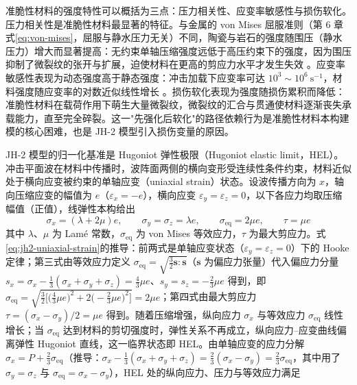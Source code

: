 准脆性材料的强度特性可以概括为三点：压力相关性、应变率敏感性与损伤软化。压力相关性是准脆性材料最显著的特征。与金属的 von Mises 屈服准则（第 6 章式\eqref{eq:von-mises}，屈服与静水压力无关）不同，陶瓷与岩石的强度随围压（静水压力）增大而显著提高：无约束单轴压缩强度远低于高压约束下的强度，因为围压抑制了微裂纹的张开与扩展，迫使材料在更高的剪应力水平才发生失效 \cite{JohnsonHolmquist1994,JohnsonHolmquist1999}。应变率敏感性表现为动态强度高于静态强度：冲击加载下应变率可达 $10^{3}\sim10^{6}~\mathrm{s}^{-1}$，材料强度随应变率的对数近似线性增长 \cite{HolmquistTempletonBishnoi2001}。损伤软化表现为强度随损伤累积而降低：准脆性材料在载荷作用下萌生大量微裂纹，微裂纹的汇合与贯通使材料逐渐丧失承载能力，直至完全碎裂。这一"先强化后软化"的路径依赖行为是准脆性材料本构建模的核心困难，也是 JH-2 模型引入损伤变量的原因。

JH-2 模型的归一化基准是 Hugoniot 弹性极限（Hugoniot elastic limit，HEL）。冲击平面波在材料中传播时，波阵面两侧的横向变形受连续性条件约束，材料近似处于横向应变被约束的单轴应变（uniaxial strain）状态。设波传播方向为 $x$，轴向压缩应变的幅值为 $e$（$\varepsilon_{x}=-e$），横向应变 $\varepsilon_{y}=\varepsilon_{z}=0$，以下各应力均取压缩幅值（正值），线弹性本构给出
\begin{equation}
  \sigma_{x}=(\lambda+2\mu)e,\qquad
  \sigma_{y}=\sigma_{z}=\lambda e,\qquad
  \sigma_{\mathrm{eq}}=2\mu e,\qquad
  \tau=\mu e
  \label{eq:jh2-uniaxial-strain}
\end{equation}
其中 $\lambda$、$\mu$ 为 Lam\'e 常数，$\sigma_{\mathrm{eq}}$ 为 von Mises 等效应力，$\tau$ 为最大剪应力。式\eqref{eq:jh2-uniaxial-strain}的推导：前两式是单轴应变状态（$\varepsilon_{y}=\varepsilon_{z}=0$）下的 Hooke 定律；第三式由等效应力定义 $\sigma_{\mathrm{eq}}=\sqrt{\tfrac{3}{2}\mathbf{s}:\mathbf{s}}$（$\mathbf{s}$ 为偏应力张量）代入偏应力分量 $s_{x}=\sigma_{x}-\tfrac{1}{3}(\sigma_{x}+\sigma_{y}+\sigma_{z})=\tfrac{4}{3}\mu e$、$s_{y}=s_{z}=-\tfrac{2}{3}\mu e$ 得到，即 $\sigma_{\mathrm{eq}}=\sqrt{\tfrac{3}{2}\bigl[\bigl(\tfrac{4}{3}\mu e\bigr)^{2}+2\bigl(-\tfrac{2}{3}\mu e\bigr)^{2}\bigr]}=2\mu e$；第四式由最大剪应力 $\tau=(\sigma_{x}-\sigma_{y})/2=\mu e$ 得到。随着压缩增强，纵向应力 $\sigma_{x}$ 与等效应力 $\sigma_{\mathrm{eq}}$ 线性增长；当 $\sigma_{\mathrm{eq}}$ 达到材料的剪切强度时，弹性关系不再成立，纵向应力--应变曲线偏离弹性 Hugoniot 直线，这一临界状态即 HEL。由单轴应变的应力分解 $\sigma_{x}=P+\tfrac{2}{3}\sigma_{\mathrm{eq}}$（推导：$\sigma_{x}-\tfrac{1}{3}(\sigma_{x}+\sigma_{y}+\sigma_{z})=\tfrac{2}{3}(\sigma_{x}-\sigma_{y})=\tfrac{2}{3}\sigma_{\mathrm{eq}}$，其中用了 $\sigma_{y}=\sigma_{z}$ 与 $\sigma_{\mathrm{eq}}=\sigma_{x}-\sigma_{y}$），HEL 处的纵向应力、压力与等效应力满足
